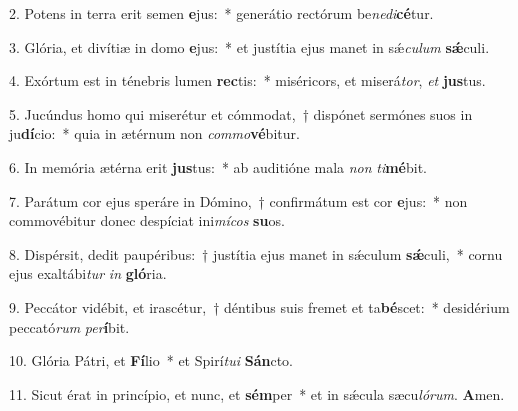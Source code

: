 \item 2. Potens in terra erit semen \textbf{e}jus:~* generátio rectórum be\textit{ne}\textit{di}\textbf{cé}tur.

\item 3. Glória, et divítiæ in domo \textbf{e}jus:~* et justítia ejus manet in sǽ\textit{cu}\textit{lum} \textbf{sǽ}culi.

\item 4. Exórtum est in ténebris lumen \textbf{rec}tis:~* miséricors, et miserá\textit{tor}, \textit{et} \textbf{jus}tus.

\item 5. Jucúndus homo qui miserétur et cómmodat,~† dispónet sermónes suos in ju\textbf{dí}cio:~* quia in ætérnum non \textit{com}\textit{mo}\textbf{vé}bitur.

\item 6. In memória ætérna erit \textbf{jus}tus:~* ab auditióne mala \textit{non} \textit{ti}\textbf{mé}bit.

\item 7. Parátum cor ejus speráre in Dómino,~† confirmátum est cor \textbf{e}jus:~* non commovébitur donec despíciat ini\textit{mí}\textit{cos} \textbf{su}os.

\item 8. Dispérsit, dedit paupéribus:~† justítia ejus manet in sǽculum \textbf{sǽ}culi,~* cornu ejus exaltábi\textit{tur} \textit{in} \textbf{gló}ria.

\item 9. Peccátor vidébit, et irascétur,~† déntibus suis fremet et ta\textbf{bé}scet:~* desidérium peccató\textit{rum} \textit{per}\textbf{í}bit.

\item 10. Glória Pátri, et \textbf{Fí}lio~* et Spirí\textit{tui} \textbf{Sán}cto.

\item 11. Sicut érat in princípio, et nunc, et \textbf{sém}per~* et in sǽcula sæcu\textit{lórum}. \textbf{A}men.
